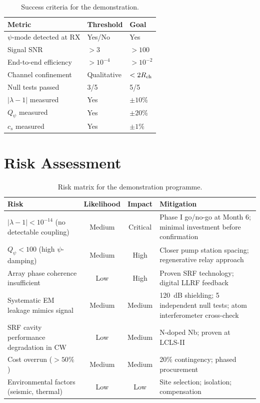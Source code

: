 \documentclass[11pt,letterpaper]{article}
\begin{document}
\begin{table}[H]
\caption{Success criteria for the demonstration.}
\begin{tabular}{lll}
\toprule
Metric & Threshold & Goal \\
\midrule
$\psi$-mode detected at RX & Yes/No & Yes \\
Signal SNR & $> 3$ & $> 100$ \\
End-to-end efficiency & $> 10^{-4}$ & $> 10^{-2}$ \\
Channel confinement & Qualitative & $< 2R_{\rm ch}$ \\
Null tests passed & 3/5 & 5/5 \\
$|\lambda - 1|$ measured & Yes & $\pm 10\%$ \\
$Q_\psi$ measured & Yes & $\pm 20\%$ \\
$c_s$ measured & Yes & $\pm 1\%$ \\
\bottomrule
\end{tabular}
\end{table}

\section{Risk Assessment}

\begin{table}[H]
\caption{Risk matrix for the demonstration programme.}
\begin{tabular}{p{4.5cm}ccp{5cm}}
\toprule
Risk & Likelihood & Impact & Mitigation \\
\midrule
$|\lambda - 1| < 10^{-14}$
(no detectable coupling) & Medium & Critical &
Phase I go/no-go at Month 6; minimal investment before confirmation \\
\midrule
$Q_\psi < 100$
(high $\psi$-damping) & Medium & High &
Closer pump station spacing; regenerative relay approach \\
\midrule
Array phase coherence
insufficient & Low & High &
Proven SRF technology; digital LLRF feedback \\
\midrule
Systematic EM leakage
mimics signal & Medium & Medium &
120~dB shielding; 5 independent null tests;
atom interferometer cross-check \\
\midrule
SRF cavity performance
degradation in CW & Low & Medium &
N-doped Nb; proven at LCLS-II \\
\midrule
Cost overrun ($> 50\%$) & Medium & Medium &
20\% contingency; phased procurement \\
\midrule
Environmental factors
(seismic, thermal) & Low & Low &
Site selection; isolation; compensation \\
\bottomrule
\end{tabular}
\end{table}
\end{document}
